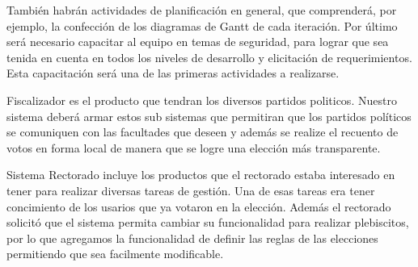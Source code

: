 También habrán actividades de planificación en general, que comprenderá, por ejemplo, la confección de los diagramas de Gantt de cada iteración.
Por último será necesario capacitar al equipo en temas de seguridad, para lograr que sea tenida en cuenta en todos los niveles de desarrollo y elicitación de requerimientos. Esta capacitación será una de las primeras actividades a realizarse.
\\ \par
Fiscalizador es el producto que tendran los diversos partidos politicos. Nuestro sistema deberá armar estos sub sistemas que permitiran que los partidos políticos se comuniquen con las facultades que deseen y además se realize el recuento de votos en forma local de manera que se logre una elección más transparente. 
\\ \par
Sistema Rectorado incluye los productos que el rectorado estaba interesado en tener para realizar diversas tareas de gestión. Una de esas tareas era tener concimiento de los usarios que ya votaron en la elección. Además el rectorado solicitó que el sistema permita cambiar su funcionalidad para realizar plebiscitos, por lo que agregamos la funcionalidad de definir las reglas de las elecciones permitiendo que sea facilmente modificable.

